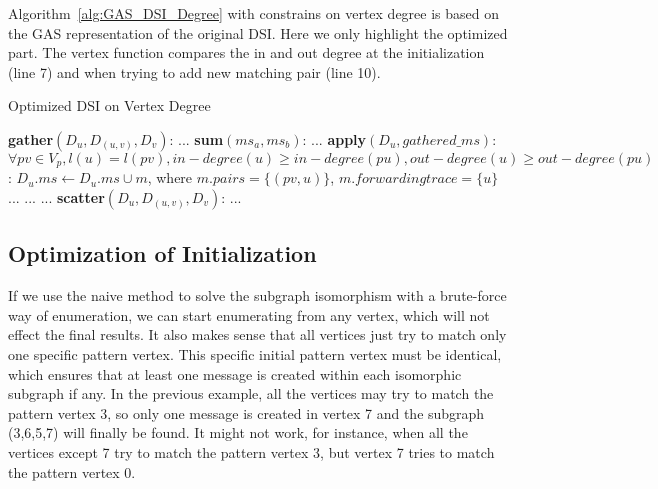 Algorithm~\vref{alg:GAS_DSI_Degree} with constrains on vertex degree is based on the GAS representation of the original DSI. Here we only highlight the optimized part. The vertex function compares the in and out degree at the initialization (line 7) and when trying to add new matching pair (line 10).

	\begin{Algorithmus}[H]
	\label{alg:GAS_DSI_Degree}
	\caption{Optimized DSI on Vertex Degree}	
	\begin{algorithmic}[1]
	\State \textbf{gather}$(D_u, D_{(u,v)}, D_v)$: 
	\State ...
	\newline
	\State \textbf{sum}$(ms_a, ms_b)$: 
	\State ...
	\newline
	\State \textbf{apply}$(D_u, gathered\_ms)$:
		\State $\forall pv \in V_p, l(u)=l(pv), in-degree(u) \geq in-degree(pu), out-degree(u) \geq out-degree(pu)$: $D_u.ms \leftarrow D_u.ms \cup m$, where $m.pairs = \{(pv, u)\}$, $m.forwardingtrace = \{u\}$   
	\Else	
		\State ...
				\State ...
			\EndIf
		\State ...
	\EndIf
	\newline
	\State \textbf{scatter}$(D_u, D_{(u,v)}, D_v)$:
	\State ...

	\end{algorithmic}	
	\end{Algorithmus}

\subsection{Optimization of Initialization}

If we use the naive method to solve the subgraph isomorphism with a brute-force way of enumeration, we can start enumerating from any vertex, which will not effect the final results. It also makes sense that all vertices just try to match only one specific pattern vertex. This specific initial pattern vertex must be identical, which ensures that at least one message is created within each isomorphic subgraph if any. In the previous example, all the vertices may try to match the pattern vertex 3, so only one message is created in vertex 7 and the subgraph (3,6,5,7) will finally be found. It might not work, for instance, when all the vertices except 7 try to match the pattern vertex 3, but vertex 7 tries to match the pattern vertex 0.

